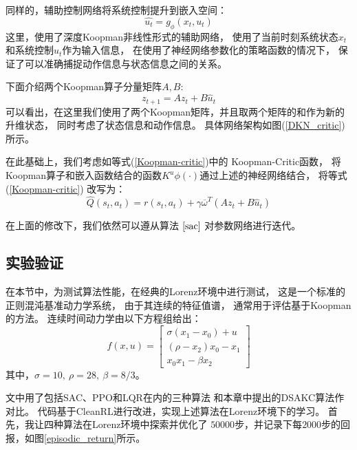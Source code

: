 \documentclass[AutoFakeBold]{LZUThesis}
\begin{document}
同样的，辅助控制网络将系统控制提升到嵌入空间：
\begin{equation}
  \hat{u_t} = g_\phi(x_t, u_t)
\end{equation}
这里，使用了深度Koopman非线性形式的辅助网络，
使用了当前时刻系统状态$x_t$和系统控制$u_t$作为输入信息，
在使用了神经网络参数化的策略函数的情况下，
保证了可以准确捕捉动作信息与状态信息之间的关系。

下面介绍两个Koopman算子分量矩阵$A, B$:
\begin{equation}
  z_{t + 1} = A z_t + B \hat{u}_t
\end{equation}
可以看出，在这里我们使用了两个Koopman矩阵，并且取两个矩阵的和作为新的升维状态，
同时考虑了状态信息和动作信息。
具体网络架构如图(\ref{DKN_critic})所示。

在此基础上，我们考虑如等式(\ref{Koopman-critic})中的 Koopman-Critic函数，
将Koopman算子和嵌入函数结合的函数$K^u \phi(\cdot)$通过上述的神经网络结合，
将等式 (\ref{Koopman-critic}) 改写为：
\begin{equation}
  \hat{Q}(s_t, a_t) = r(s_t, a_t)
  + \gamma \overline{\omega}^T ( A z_t + B \hat{u}_t )
\end{equation}

在上面的修改下，我们依然可以遵从算法 
$\ref{sac}$ 对参数网络进行迭代。

\subsection{实验验证}
在本节中，为测试算法性能，在经典的Lorenz环境中进行测试，
这是一个标准的正则混沌基准动力学系统，
由于其连续的特征值谱\cite{brunton_chaos_2017}，
通常用于评估基于Koopman的方法。
连续时间动力学由以下方程组给出：
\begin{equation}
  f(x, u)=\left[\begin{array}{c}
  \sigma\left(x_{1}-x_{0}\right)+u \\
  \left(\rho-x_{2}\right) x_{0}-x_{1} \\
  x_{0} x_{1}-\beta x_{2}
  \end{array}\right]
\end{equation}
其中，$\sigma = 10,\ \rho = 28,\ \beta = 8/3$。

文中用了包括SAC、PPO和LQR在内的三种算法
和本章中提出的DSAKC算法作对比。
代码基于CleanRL\cite{huang2022cleanrl}进行改进，实现上述算法在Lorenz环境下的学习。
首先，我让四种算法在Lorenz环境中探索并优化了
$50000$步，并记录下每$2000$步的回报，如图\ref{episodic_return}所示。
\end{document}
